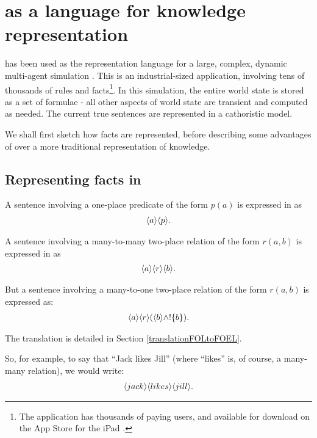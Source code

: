 \section{\Cathoristic{} as a language for knowledge representation}\label{kr}


\Cathoristic{} has been used as the representation language for a
large, complex, dynamic multi-agent simulation \cite{evans-and-short}.
This is an industrial-sized application, involving tens of thousands
of rules and facts\footnote{The application has thousands of paying
  users, and available for download on the App Store for the iPad
  \cite{Versu}.}.  In this simulation, the entire world state is stored
as a set of \cathoristic{} formulae - all other aspects of world state
are transient and computed as needed.  The current true sentences are
represented in a cathoristic model.

We shall first sketch how facts are represented, before describing some
advantages of \cathoristic{} over a more traditional \fol{}
representation of knowledge.

\subsection{Representing facts  in \cathoristic{}}

A sentence involving a one-place predicate of the form $p(a)$ is
expressed in \cathoristic{} as
\begin{eqnarray*}
   \langle a \rangle \langle p \rangle .
\end{eqnarray*}

\NI A sentence involving a many-to-many two-place relation of the form
$r(a,b)$ is expressed in \cathoristic{} as
\begin{eqnarray*}
  \langle a \rangle \langle r \rangle \langle b \rangle .
\end{eqnarray*}

\NI But a sentence involving a many-to-one two-place relation of the
form $r(a,b)$ is expressed as:
\begin{eqnarray*}
  \langle a \rangle \langle r \rangle (\langle b \rangle \land ! \{b\}).
\end{eqnarray*}

\NI The translation is detailed in Section \ref{translationFOLtoFOEL}.

So, for example, to say that ``Jack likes Jill'' (where ``likes'' is,
of course, a many-many relation), we would write:
\begin{eqnarray*}
  \langle jack \rangle \langle likes \rangle \langle jill \rangle .
\end{eqnarray*}

